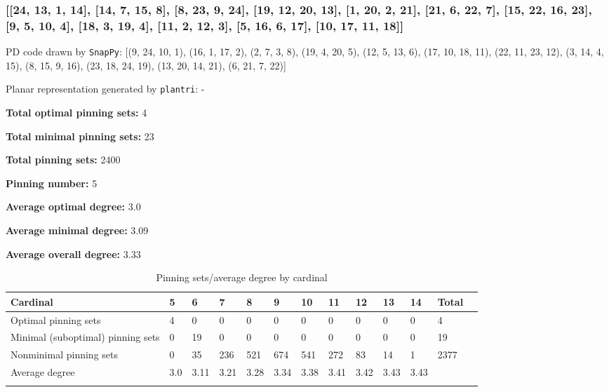 \documentclass{article}%
\begin{document}
\subsubsection{[[24, 13, 1, 14], [14, 7, 15, 8], [8, 23, 9, 24], [19, 12, 20, 13], [1, 20, 2, 21], [21, 6, 22, 7], [15, 22, 16, 23], [9, 5, 10, 4], [18, 3, 19, 4], [11, 2, 12, 3], [5, 16, 6, 17], [10, 17, 11, 18]]}

{\small\noindent PD code drawn by \texttt{SnapPy}: [(9, 24, 10, 1), (16, 1, 17, 2), (2, 7, 3, 8), (19, 4, 20, 5), (12, 5, 13, 6), (17, 10, 18, 11), (22, 11, 23, 12), (3, 14, 4, 15), (8, 15, 9, 16), (23, 18, 24, 19), (13, 20, 14, 21), (6, 21, 7, 22)]}

{\small\noindent Planar representation generated by \texttt{plantri}: -}

\begin{multicols}{2}
{\normalsize \noindent\textbf{Total optimal pinning sets:} 4

\noindent\textbf{Total minimal pinning sets:} 23

\noindent\textbf{Total pinning sets:} 2400

\noindent\textbf{Pinning number:} 5

}
\columnbreak

{\normalsize \noindent\textbf{Average optimal degree:} 3.0

\noindent\textbf{Average minimal degree:} 3.09

\noindent\textbf{Average overall degree:} 3.33

}
\end{multicols}

\begin{table}[ht]
	\caption{Pinning sets/average degree by cardinal}
	\centering
	\renewcommand{\arraystretch}{1.5}
	\begin{tabularx}{\textwidth}{lXXXXXXXXXXXX}
		\toprule
			Cardinal & 5 & 6 & 7 & 8 & 9 & 10 & 11 & 12 & 13 & 14 & Total\\
			\hline
			Optimal pinning sets & 4 & 0 & 0 & 0 & 0 & 0 & 0 & 0 & 0 & 0 & 4 \\
			Minimal (suboptimal) pinning sets & 0 & 19 & 0 & 0 & 0 & 0 & 0 & 0 & 0 & 0 & 19 \\
			Nonminimal pinning sets & 0 & 35 & 236 & 521 & 674 & 541 & 272 & 83 & 14 & 1 & 2377 \\
			Average degree & 3.0 & 3.11 & 3.21 & 3.28 & 3.34 & 3.38 & 3.41 & 3.42 & 3.43 & 3.43 &  \\
		\bottomrule \\ 
	\end{tabularx}
\end{table}
\end{document}
